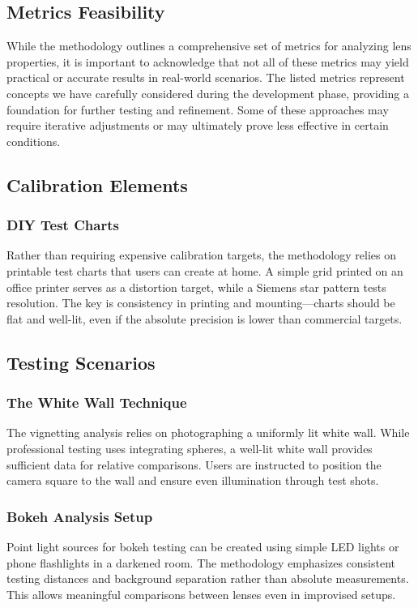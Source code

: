 \subsection{Metrics Feasibility}
While the methodology outlines a comprehensive set of metrics for analyzing lens properties, it is important to acknowledge that not all of these metrics may yield practical or accurate results in real-world scenarios. The listed metrics represent concepts we have carefully considered during the development phase, providing a foundation for further testing and refinement. Some of these approaches may require iterative adjustments or may ultimately prove less effective in certain conditions.

\subsection{Calibration Elements}
\subsubsection{DIY Test Charts}
Rather than requiring expensive calibration targets, the methodology relies on printable test charts that users can create at home. A simple grid printed on an office printer serves as a distortion target, while a Siemens star pattern tests resolution. The key is consistency in printing and mounting---charts should be flat and well-lit, even if the absolute precision is lower than commercial targets.

\subsection{Testing Scenarios}
\subsubsection{The White Wall Technique}
The vignetting analysis relies on photographing a uniformly lit white wall. While professional testing uses integrating spheres, a well-lit white wall provides sufficient data for relative comparisons. Users are instructed to position the camera square to the wall and ensure even illumination through test shots.

\subsubsection{Bokeh Analysis Setup} 
Point light sources for bokeh testing can be created using simple LED lights or phone flashlights in a darkened room. The methodology emphasizes consistent testing distances and background separation rather than absolute measurements. This allows meaningful comparisons between lenses even in improvised setups.

